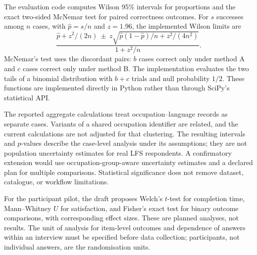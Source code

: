 The evaluation code computes Wilson 95\% intervals for proportions and
the exact two-sided McNemar test for paired correctness outcomes. For
$s$ successes among $n$ cases, with $\widehat{p}=s/n$ and $z=1.96$, the
implemented Wilson limits are
\[
 \frac{\widehat{p}+z^2/(2n)
       \ \pm\ z\sqrt{\widehat{p}(1-\widehat{p})/n+z^2/(4n^2)}}
      {1+z^2/n}.
\]
McNemar's test uses the discordant pairs: $b$ cases correct only under
method A and $c$ cases correct only under method B. The implementation
evaluates the two tails of a binomial distribution with $b+c$ trials and
null probability $1/2$. These functions are implemented directly in
Python rather than through SciPy's statistical API.

The reported aggregate calculations treat occupation--language records
as separate cases. Variants of a shared occupation identifier are
related, and the current calculations are not adjusted for that
clustering. The resulting intervals and $p$-values describe the
case-level analysis under its assumptions; they are not population
uncertainty estimates for real LFS respondents. A confirmatory extension
would use occupation-group-aware uncertainty estimates and a declared
plan for multiple comparisons. Statistical significance does not remove
dataset, catalogue, or workflow limitations.

For the participant pilot, the draft proposes Welch's $t$-test for
completion time, Mann--Whitney $U$ for satisfaction, and Fisher's exact
test for binary outcome comparisons, with corresponding effect sizes.
These are planned analyses, not results. The unit of analysis for
item-level outcomes and dependence of answers within an interview must be
specified before data collection; participants, not individual answers,
are the randomisation units.
